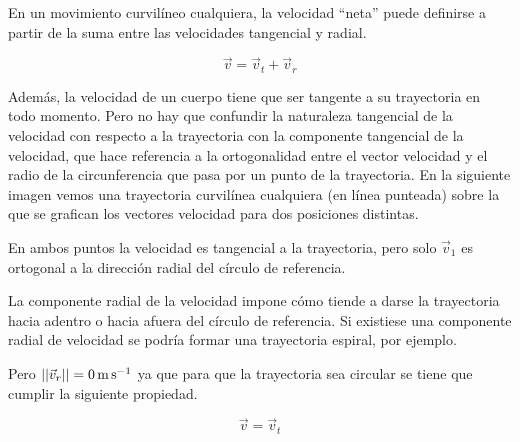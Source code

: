 En un movimiento curvilíneo cualquiera, la velocidad ``neta'' puede definirse a partir de la suma entre las velocidades tangencial y radial.

\begin{mdframed}[style=DefinitionFrame]
    \begin{defn}
    \end{defn}
    \begin{equation*}
        \Vec{v} = \Vec{v}_t + \Vec{v}_r
    \end{equation*}
\end{mdframed}

Además, la velocidad de un cuerpo tiene que ser tangente a su trayectoria en todo momento.
Pero no hay que confundir la naturaleza tangencial de la velocidad con respecto a la trayectoria con la componente tangencial de la velocidad, que hace referencia a la ortogonalidad entre el vector velocidad y el radio de la circunferencia que pasa por un punto de la trayectoria.
En la siguiente imagen vemos una trayectoria curvilínea cualquiera (en línea punteada) sobre la que se grafican los vectores velocidad para dos posiciones distintas.

\begin{center}
    \def\svgwidth{\linewidth}
    
\end{center}

En ambos puntos la velocidad es tangencial a la trayectoria, pero solo $\vec{v}_1$ es ortogonal a la dirección radial del círculo de referencia.

La componente radial de la velocidad impone cómo tiende a darse la trayectoria hacia adentro o hacia afuera del círculo de referencia.
Si existiese una componente radial de velocidad se podría formar una trayectoria espiral, por ejemplo.

Pero ${\left|\left| {\Vec{v}_r} \right|\right|} = \SI{0}{\metre\per\second}$ ya que para que la trayectoria sea circular se tiene que cumplir la siguiente propiedad.

\begin{mdframed}[style=PropertyFrame]
    \begin{prop}
        \label{prop:circularMovVel}
    \end{prop}
    \begin{equation*}
        \Vec{v} = \Vec{v}_t
    \end{equation*}
\end{mdframed}

